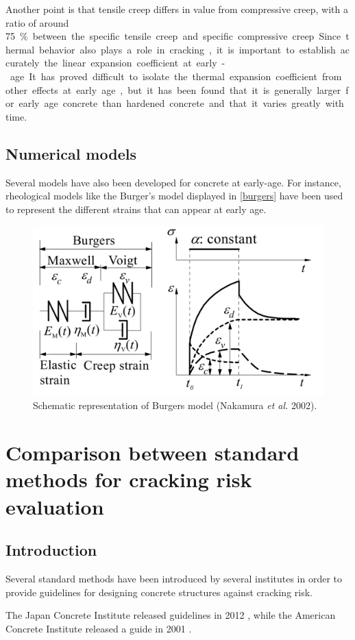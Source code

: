 \documentclass[a4paper,11pt]{memoir}
\begin{document}
Another point is that tensile creep differs in value from compressive creep,
with a ratio of around \SI{75}\percent between the specific tensile creep and
specific compressive creep.

Since thermal behavior also plays a role in cracking, it is important to
establish accurately the linear expansion coefficient at early-age. It has
proved difficult to isolate the thermal expansion coefficient from other
effects at early age, but it has been found that it is generally larger for
early age concrete than hardened concrete and that it varies greatly with time.

\subsection{Numerical models}

Several models have also been developed for concrete at early-age. For
instance, rheological models like the Burger's model displayed in
\autoref{burgers} have been used to represent the different strains that can
appear at early age.

\begin{figure}
  \centering
  \includegraphics[width=.5\linewidth]{burgers}
  \caption{Schematic representation of Burgers model (Nakamura \textit{et al.}
  2002).}\label{burgers}
\end{figure}

\section{Comparison between standard methods for cracking risk evaluation}
\subsection{Introduction}

Several standard methods have been introduced by several institutes in order to
provide guidelines for designing concrete structures against cracking risk.

The Japan Concrete Institute released guidelines in 2012 \cite{jci}, while the
American Concrete Institute released a guide in 2001 \cite{aci}.
\end{document}
